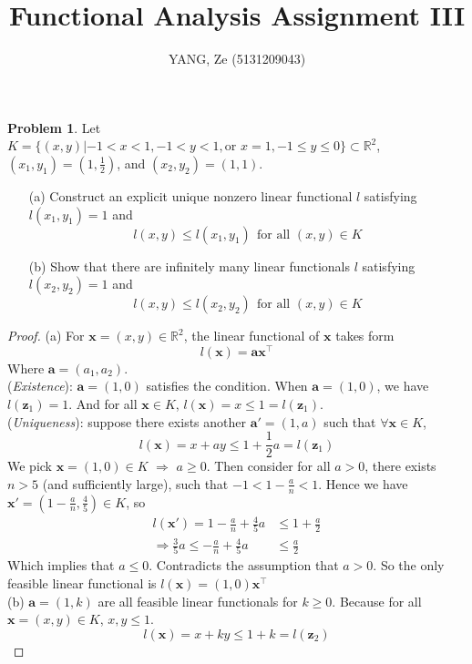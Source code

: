 \documentclass[a4paper, 10pt]{article}
\title{\textbf{Functional Analysis Assignment III}}
\author{YANG, Ze (5131209043)}
\theoremstyle{definition}
\newtheorem{problem}{Problem}
\theoremstyle{hSol}
\begin{document}
\maketitle

\begin{problem} Let $K=\{(x,y)|-1<x<1, -1<y<1, \text{or }x=1, -1\leq y\leq 0\} \subset \mathbb{R}^2$, $(x_1, y_1)=(1,\frac{1}{2})$, and $(x_2, y_2)=(1,1)$.
\begin{itemize}
	\item[(a)] Construct an explicit unique nonzero linear functional $l$ satisfying $l(x_1, y_1)=1$ and 
	$$l(x, y) \leq l(x_1, y_1)~~\text{for all $(x,y)\in K$}$$
	\item[(b)] Show that there are infinitely many linear functionals $l$ satisfying $l(x_2, y_2)=1$ and
	$$l(x, y) \leq l(x_2, y_2)~~\text{for all $(x,y)\in K$}$$
\end{itemize}
\end{problem}
\begin{proof} (a) For $\bm{x}=(x, y)\in \mathbb{R}^2$, the linear functional of $\bm{x}$ takes form
$$l(\bm{x})=\bm{a}\bm{x}^{\top}$$
Where $\bm{a}=(a_1, a_2)$. \\
(\textit{Existence}): $\bm{a}=(1,0)$ satisfies the condition. When $\bm{a}=(1,0)$, we have $l(\bm{z}_1)=1$. And for all $\bm{x}\in K$, $l(\bm{x})=x \leq 1 = l(\bm{z}_1)$.\\
(\textit{Uniqueness}): suppose there exists another $\bm{a}'=(1,a)$ such that $\forall \bm{x}\in K$,
$$l(\bm{x})=x+ay \leq 1+\frac{1}{2}a = l(\bm{z}_1)$$
We pick $\bm{x}=(1,0)\in K$ $\Rightarrow$ $a\geq 0$. Then consider for all $a>0$, there exists $n>5$ (and sufficiently large), such that $-1<1-\frac{a}{n}<1$. Hence we have $\bm{x}'=(1-\frac{a}{n}, \frac{4}{5})\in K$, so 
\begin{equation}
  \begin{split}
    l(\bm{x}')=1-\frac{a}{n}+\frac{4}{5}a &\leq 1+\frac{a}{2}\\
    \Rightarrow \frac{3}{5}a  \leq  -\frac{a}{n}+\frac{4}{5}a &\leq \frac{a}{2}
  \end{split}
\end{equation}
Which implies that $a\leq 0$. Contradicts the assumption that $a>0$. So the only feasible linear functional is $l(\bm{x})=(1,0)\bm{x}^{\top}$\\
(b) $\bm{a}=(1,k)$ are all feasible linear functionals for $k\geq 0$. Because for all $\bm{x}=(x,y)\in K$, $x,y\leq1$.
\begin{equation}
  l(\bm{x})=x+ky \leq 1+k =l(\bm{z}_2)
\end{equation}
\end{proof} 
\end{document}
